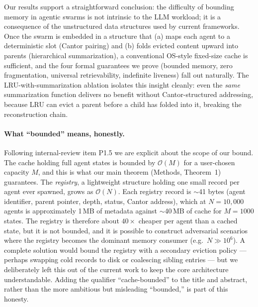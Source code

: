 \documentclass[fleqn,10pt]{article}
\theoremstyle{definition}
\newcommand{\Oh}{\mathcal{O}}
\newcommand{\slots}{M}
\begin{document}
Our results support a straightforward conclusion: the difficulty of
bounding memory in agentic swarms is not intrinsic to the LLM
workload; it is a consequence of the unstructured data structures
used by current frameworks. Once the swarm is embedded in a
structure that (a) maps each agent to a deterministic slot
(Cantor pairing) and (b) folds evicted content upward into parents
(hierarchical summarization), a conventional OS-style fixed-size
cache is sufficient, and the four formal guarantees we prove
(bounded memory, zero fragmentation, universal retrievability,
indefinite liveness) fall out naturally. The LRU-with-summarization
ablation isolates this insight cleanly: even the \emph{same}
summarization function delivers no benefit without Cantor-structured
addressing, because LRU can evict a parent before a child has folded
into it, breaking the reconstruction chain.

\paragraph{What ``bounded'' means, honestly.}
Following internal-review item P1.5 we are explicit about the
scope of our bound. The cache holding full agent states is bounded by
$\Oh(M)$ for a user-chosen capacity $M$, and this is what our main
theorem (Methods, Theorem~1) guarantees. The \emph{registry}, a
lightweight structure holding one small record per agent ever
spawned, grows as $\Oh(N)$. Each registry record is $\sim$41 bytes
(agent identifier, parent pointer, depth, status, Cantor address),
which at $N{=}10{,}000$ agents is approximately 1\,MB of metadata
against $\sim$40\,MB of cache for $\slots{=}1000$ states. The
registry is therefore about $40\times$ cheaper per agent than a
cached state, but it is not bounded, and it is possible to construct
adversarial scenarios where the registry becomes the dominant memory
consumer (e.g.\ $N{\gg}10^6$). A complete solution would bound the
registry with a secondary eviction policy --- perhaps swapping cold
records to disk or coalescing sibling entries --- but we deliberately
left this out of the current work to keep the core architecture
understandable. Adding the qualifier ``cache-bounded'' to the title
and abstract, rather than the more ambitious but misleading
``bounded,'' is part of this honesty.
\end{document}
